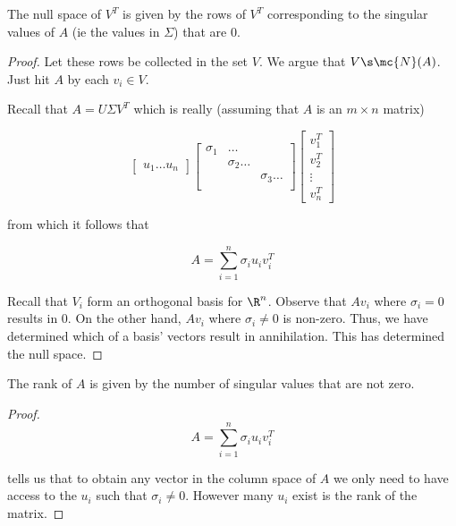 \documentclass[../main.tex]{subfiles}
\begin{document}
\begin{proposition}
   The null space of $V^T$ is given by the rows of $V^T$ corresponding to the singular values of $A$ (ie the values in $\Sigma$) that are $0$.
\end{proposition}
\begin{proof}
    Let these rows be collected in the set $V$. We argue
    that $V \s \mc{N}(A)$. Just hit $A$ by each $v_i \in V$.

    Recall that $A = U \Sigma V^T$ which is really (assuming that $A$ is an $m \times n$ matrix)


    \[
        \begin{bmatrix}
            u_1 \dots u_n
        \end{bmatrix} \begin{bmatrix}
            \sigma_1 & \dots \\

            & \sigma_2 \dots \\
            & & \sigma_3 \dots \\
        \end{bmatrix}
        \begin{bmatrix}
            v_1^T \\
            v_2^T \\
            \vdots \\
            v_n^T
        \end{bmatrix}
    \]

    from which it follows that 

    \[
        A = \sum_{i=1}^{n}\sigma_{i} u_{i} v_{i}^T
    \]

    Recall that $V_{i}$ form an orthogonal basis for $\R^n$. Observe that $A v_{i}$ where $\sigma_{i} = 0$ results in $0$. On the other hand, $A v_{i}$ where $\sigma_{i} \not = 0$ is non-zero. Thus, we have determined which of a basis' vectors result in annihilation. This has determined the null space.
\end{proof}

\begin{proposition}
    The rank of $A$ is given by the number of singular values
    that are not zero.
\end{proposition}
\begin{proof}
    \[
        A = \sum_{i=1}^{n}\sigma_{i} u_{i} v_{i}^T
    \]

    tells us that to obtain any vector in the column space of $A$ we only need to have access to the $u_i$ such that $\sigma_i \not = 0$. However many $u_i$ exist is the rank of the matrix.
\end{proof}
\end{document}
